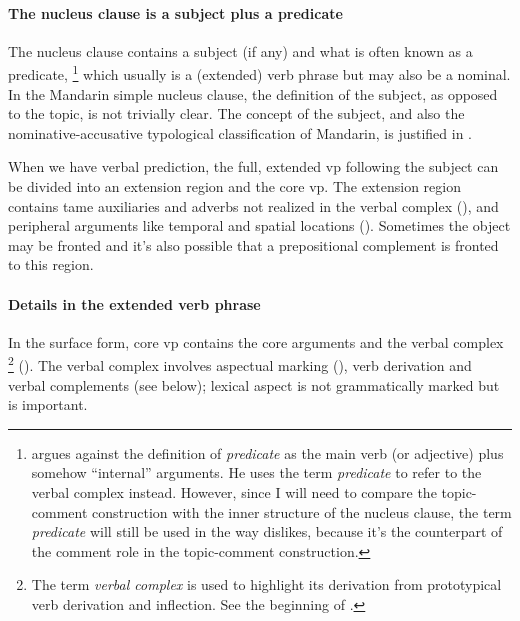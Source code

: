 \documentclass[UTF8, a4paper, oneside, scheme=plain, 12pt]{ctexrep}
\newcommand*{\term}[1]{\emph{#1}}
\begin{document}
\paragraph*{The nucleus clause is a subject plus a predicate}
The nucleus clause contains a subject (if any) and what is often known as a predicate,%
\footnote{
    \citet{dixon2009basic} argues against the definition of \term{predicate} 
    as the main verb (or adjective) plus somehow ``internal'' arguments.
    He uses the term \term{predicate} to refer to the verbal complex instead.
    However, since I will need to compare the topic-comment construction 
    with the inner structure of the nucleus clause,
    the term \term{predicate} will still be used in the way \citet{dixon2009basic} dislikes,
    because it's the counterpart of the comment role in the topic-comment construction.
}
which usually is a (extended) verb phrase but may also be a nominal. 
In the Mandarin simple nucleus clause,
the definition of the subject, as opposed to the topic,
is not trivially clear.
The concept of the subject, and also the nominative-accusative typological classification of Mandarin, is justified in .

When we have verbal prediction, the full, extended \acs{vp} following the subject 
can be divided into an extension region and the core \acs{vp}.
The extension region contains 
\acs{tame} auxiliaries and adverbs not realized in the verbal complex (),
and peripheral arguments like temporal and spatial locations ().
Sometimes the object may be fronted and 
it's also possible that a prepositional complement is fronted to this region.

\paragraph*{Details in the extended verb phrase}
In the surface form, core \acs{vp} contains the core arguments and the verbal complex%
\footnote{
    The term \term{verbal complex} is used to highlight
    its derivation from prototypical verb derivation and inflection.
    See the beginning of .
}
().
The verbal complex involves aspectual marking (), 
verb derivation and verbal complements (see below);
lexical aspect is not grammatically marked but is important.
\end{document}
